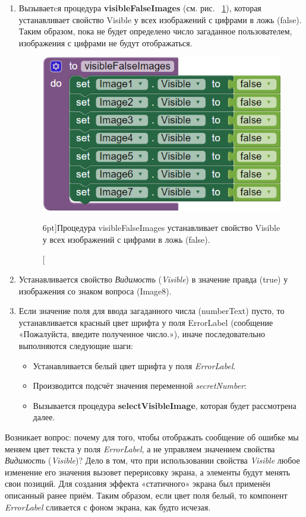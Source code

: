 \begin{enumerate}
  \item Вызываетcя процедура \textbf{visibleFalseImages} (см. рис. ~\ref{fig:block:visible:false:images}), которая устанавливает свойство Visible у всех изображений с цифрами в ложь (false). Таким образом, пока не будет определено число загаданное пользователем, изображения с цифрами не будут отображаться.
  \begin{figure}
    \includegraphics{./graphics/programs/guess_numbers/procedure_visibleFalseImages_AppInventor_2018.png}
      \caption[Процедура visibleFalseImages.][6pt]{Процедура visibleFalseImages устанавливает свойство Visible у всех изображений с цифрами в ложь (false).}
    \label{fig:block:visible:false:images}
  \end{figure}

  \item Устанавливается свойство \textit{Видимость} (\textit{Visible}) в значение правда (true) у изображения со знаком вопроса (Image8).
  \item Если значение поля для ввода загаданного числа (numberText) пусто, то устанавливается красный цвет шрифта у поля ErrorLabel (сообщение «Пожалуйста, введите полученное число.»), иначе последовательно выполняются следующие шаги:
  \begin{itemize}
    \item Устанавливается белый цвет шрифта у поля \textit{ErrorLabel}.
    \item Производится подсчёт значения переменной \textit{secretNumber}:
    \item Вызывается процедура \textbf{selectVisibleImage}, которая будет рассмотрена далее.
  \end{itemize}
\end{enumerate}
Возникает вопрос: почему для того, чтобы отображать сообщение об ошибке мы меняем цвет текста у поля \textit{ErrorLabel}, а не управляем значением свойства \textit{Видимость} (\textit{Visible})? Дело в том, что при использовании свойства \textit{Visible} любое изменение его значения вызовет перерисовку экрана, а элементы будут менять свои позиций. Для создания эффекта «статичного» экрана был применён описанный ранее приём. Таким образом, если цвет поля белый, то компонент \textit{ErrorLabel} сливается с фоном экрана, как будто исчезая.
